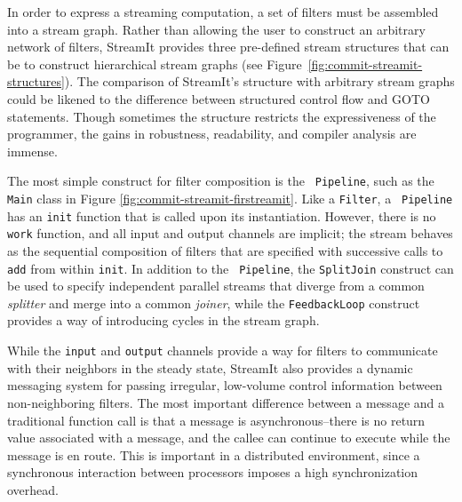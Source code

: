 In order to express a streaming computation, a set of filters must be
assembled into a stream graph.  Rather than allowing the user to
construct an arbitrary network of filters, StreamIt provides three
pre-defined stream structures that can be to construct hierarchical
stream graphs (see Figure~\ref{fig:commit-streamit-structures}).  The
comparison of StreamIt's structure with arbitrary stream graphs could
be likened to the difference between structured control flow and GOTO
statements.  Though sometimes the structure restricts the
expressiveness of the programmer, the gains in robustness,
readability, and compiler analysis are immense.

The most simple construct for filter composition is the {\tt
Pipeline}, such as the {\tt Main} class in Figure
\ref{fig:commit-streamit-firstreamit}.  Like a {\tt Filter}, a {\tt
Pipeline} has an {\tt init} function that is called upon its
instantiation.  However, there is no {\tt work} function, and all
input and output channels are implicit; the stream behaves as the
sequential composition of filters that are specified with successive
calls to {\tt add} from within {\tt init}.  In addition to the {\tt
Pipeline}, the {\tt SplitJoin} construct can be used to specify
independent parallel streams that diverge from a common {\it splitter}
and merge into a common {\it joiner}, while the {\tt FeedbackLoop}
construct provides a way of introducing cycles in the stream graph.

While the {\tt input} and {\tt output} channels provide a way for
filters to communicate with their neighbors in the steady state,
StreamIt also provides a dynamic messaging system for passing
irregular, low-volume control information between non-neighboring
filters.  
The most important difference between a message and a traditional
function call is that a message is asynchronous--there is no return
value associated with a message, and the callee can continue to
execute while the message is en route.  This is important in a
distributed environment, since a synchronous interaction between
processors imposes a high synchronization overhead.


